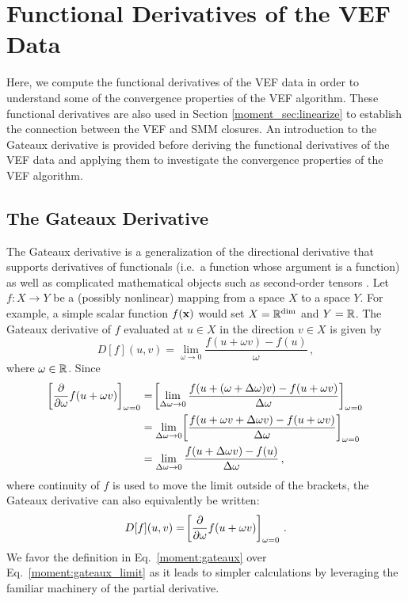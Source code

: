 \documentclass[../doc.tex]{subfiles}
\begin{document}
\section{Functional Derivatives of the VEF Data} \label{moment_sec:gateaux}
Here, we compute the functional derivatives of the VEF data in order to understand some of the convergence properties of the VEF algorithm. These functional derivatives are also used in Section \ref{moment_sec:linearize} to establish the connection between the VEF and SMM closures. An introduction to the Gateaux derivative is provided before deriving the functional derivatives of the VEF data and applying them to investigate the convergence properties of the VEF algorithm.  

\subsection{The Gateaux Derivative}
The Gateaux derivative is a generalization of the directional derivative that supports derivatives of functionals (i.e.~a function whose argument is a function) as well as complicated mathematical objects such as second-order tensors \cite{vainberg64}. Let $f : X\rightarrow Y$ be a (possibly nonlinear) mapping from a space $X$ to a space $Y$. For example, a simple scalar function $f(\boldsymbol{\mathrm{x}})$ would set $X = \mathbb{R}^{\dim}$ and $Y = \mathbb{R}$. The Gateaux derivative of $f$ evaluated at $u\in X$ in the direction $v \in X$ is given by 
	\begin{equation} \label{moment:gateaux_limit}
		D[f](u,v) = \lim_{\omega\rightarrow 0} \frac{f(u+\omega v) - f(u)}{\omega} \,,
	\end{equation}
where $\omega\in \mathbb{R}$. Since 
	\begin{equation}
	\begin{aligned}
		\!\left[ \frac{\partial }{\partial \omega}f(u + \omega v) \right]_{\omega=0} &= \!\left[ \lim_{\Delta\omega \rightarrow 0} \frac{f(u+(\omega+\Delta\omega)v) - f(u + \omega v)}{\Delta\omega} \right]_{\omega=0} \\
		&= \lim_{\Delta\omega \rightarrow 0}\!\left[ \frac{f(u + \omega v + \Delta\omega v) - f(u + \omega v)}{\Delta\omega} \right]_{\omega=0} \\
		&= \lim_{\Delta\omega\rightarrow 0} \frac{f(u + \Delta\omega v) - f(u)}{\Delta\omega} \,,
	\end{aligned}
	\end{equation}
where continuity of $f$ is used to move the limit outside of the brackets, the Gateaux derivative can also equivalently be written: 
	\begin{equation} \label{moment:gateaux}
		D[f](u,v) = \!\left[ \frac{\partial }{\partial \omega}f(u + \omega v) \right]_{\omega=0} \,. 
	\end{equation}
We favor the definition in Eq.~\ref{moment:gateaux} over Eq.~\ref{moment:gateaux_limit} as it leads to simpler calculations by leveraging the familiar machinery of the partial derivative. 
\end{document}
